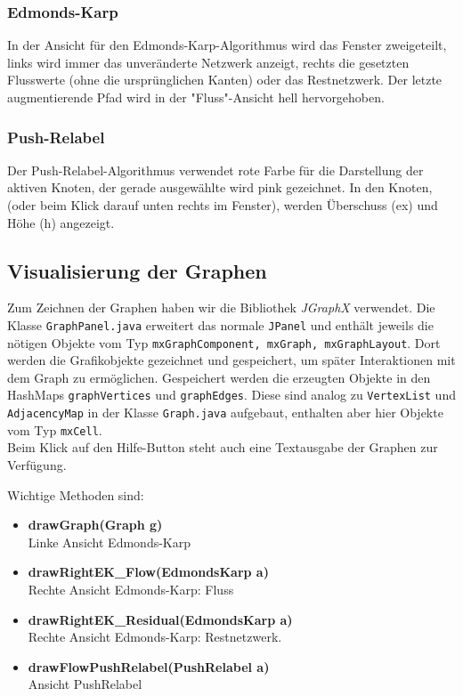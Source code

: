 \documentclass{llncs}
\begin{document}
\subsubsection{Edmonds-Karp}
In der Ansicht für den Edmonds-Karp-Algorithmus wird das Fenster zweigeteilt, links wird immer das unveränderte Netzwerk anzeigt, rechts die gesetzten Flusswerte (ohne die ursprünglichen Kanten) oder das Restnetzwerk. Der letzte augmentierende Pfad wird in der "Fluss"-Ansicht hell hervorgehoben.

\subsubsection{Push-Relabel}
Der Push-Relabel-Algorithmus verwendet rote Farbe für die Darstellung der aktiven Knoten, der gerade ausgewählte wird pink gezeichnet. In den Knoten, (oder beim Klick darauf unten rechts im Fenster), werden Überschuss (ex) und Höhe (h) angezeigt.



\subsection{Visualisierung der Graphen}

Zum Zeichnen der Graphen haben wir die Bibliothek \textit{JGraphX} \cite{JGraphX} verwendet. Die Klasse \texttt{GraphPanel.java} erweitert das normale \texttt{JPanel} und enthält jeweils die nötigen Objekte vom Typ \texttt{mxGraphComponent, mxGraph, mxGraphLayout}. Dort werden die Grafikobjekte gezeichnet und gespeichert, um später Interaktionen mit dem Graph zu ermöglichen. Gespeichert werden die erzeugten Objekte in den HashMaps \texttt{graphVertices} und \texttt{graphEdges}. Diese sind analog zu \texttt{VertexList} und \texttt{AdjacencyMap} in der Klasse \texttt{Graph.java} aufgebaut, enthalten aber hier Objekte vom Typ \texttt{mxCell}. \\
Beim Klick auf den Hilfe-Button steht auch eine Textausgabe der Graphen zur Verfügung.

Wichtige Methoden sind: 

\begin{itemize}
\item \textbf{drawGraph(Graph g)} \\
Linke Ansicht Edmonds-Karp
\item \textbf{drawRightEK\_Flow(EdmondsKarp a)} \\
Rechte Ansicht Edmonds-Karp: Fluss
\item \textbf{drawRightEK\_Residual(EdmondsKarp a)} \\
Rechte Ansicht Edmonds-Karp: Restnetzwerk.
\item \textbf{drawFlowPushRelabel(PushRelabel a)} \\
Ansicht PushRelabel
\end{itemize}
\end{document}
